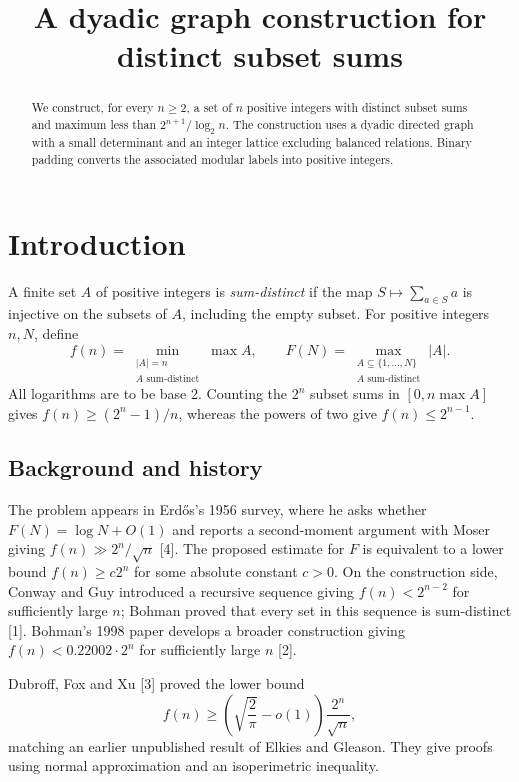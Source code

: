 \documentclass[reqno]{amsart}
\theoremstyle{remark}
\numberwithin{equation}{section}
\begin{document}
\title{A dyadic graph construction for distinct subset sums}

\begin{abstract}
We construct, for every $n \geq 2$, a set of $n$ positive integers with distinct subset sums
and maximum less than $2^{n+1}/\log_2 n$.  The construction uses a dyadic directed graph with a small
determinant and an integer lattice excluding balanced relations.  Binary padding converts the
associated modular labels into positive integers.
\end{abstract}

\maketitle

\section{Introduction}

A finite set $A$ of positive integers is \emph{sum-distinct} if the map
$S \mapsto \sum_{a\in S}a$ is injective on the subsets of $A$, including the empty subset.  For
positive integers $n,N$, define
\[
f(n)=\min_{\substack{|A|=n\\ A\text{ sum-distinct}}}\max A,
\qquad
F(N)=\max_{\substack{A\subseteq\{1,\ldots,N\}\\ A\text{ sum-distinct}}}|A|.
\]
All logarithms are to be base 2.  Counting the $2^n$ subset sums in $[0,n\max A]$ gives
$f(n)\geq (2^n-1)/n$, whereas the powers of two give $f(n)\leq 2^{n-1}$.

\subsection{Background and history}

The problem appears in Erdős's 1956 survey, where he asks whether $F(N)=\log N+O(1)$ and
reports a second-moment argument with Moser giving $f(n)\gg 2^n/\sqrt n$ [4].  The proposed
estimate for $F$ is equivalent to a lower bound $f(n)\geq c2^n$ for some absolute constant
$c>0$.  On the construction side, Conway and Guy introduced a recursive sequence giving
$f(n)<2^{n-2}$ for sufficiently large $n$; Bohman proved that every set in this sequence is
sum-distinct [1].  Bohman's 1998 paper develops a broader construction giving
$f(n)<0.22002\mathbin{\cdot}2^n$ for sufficiently large $n$ [2].

Dubroff, Fox and Xu [3] proved the lower bound
\[
f(n)\geq\left(\sqrt{\frac{2}{\pi}}-o(1)\right)\frac{2^n}{\sqrt n},
\]
matching an earlier unpublished result of Elkies and Gleason.  They give proofs using normal
approximation and an isoperimetric inequality.
\end{document}
